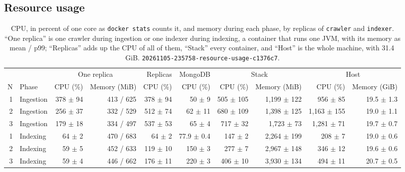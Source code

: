 \documentclass[11pt,a4paper]{article}
\newcommand{\code}[1]{\nolinkurl{#1}}
\newcommand{\run}[1]{\nolinkurl{#1}}
\begin{document}
\subsection{Resource usage}
\label{sec:resources}

\begin{table}[ht]
\centering
\scriptsize
\setlength{\tabcolsep}{3.5pt}
\caption{CPU, in percent of one core as \code{docker stats} counts it, and memory during each phase, by replicas of
\code{crawler} and \code{indexer}. ``One replica'' is one crawler during ingestion or one indexer during indexing, a
container that runs one JVM, with its memory as mean / p99; ``Replicas'' adds up the CPU of all of them, ``Stack''
every container, and ``Host'' is the whole machine, with 31.4\,GiB. \run{20261105-235758-resource-usage-c1376c7}.}
\label{tab:resources}
\begin{tabular}{@{}rlrrrrrrrr@{}}
\toprule
& & \multicolumn{2}{c}{One replica} & Replicas & MongoDB & \multicolumn{2}{c}{Stack} & \multicolumn{2}{c}{Host} \\
\cmidrule(lr){3-4}\cmidrule(lr){5-5}\cmidrule(lr){6-6}\cmidrule(lr){7-8}\cmidrule(l){9-10}
N & Phase & CPU (\%) & Memory (MiB) & CPU (\%) & CPU (\%) & CPU (\%) & Memory (MiB) & CPU (\%) & Memory (GiB) \\
\midrule
1 & Ingestion & 378 $\pm$ 94 & 413 / 625 & 378 $\pm$ 94 & 50 $\pm$ 9 & 505 $\pm$ 105 & 1{,}199 $\pm$ 122 & 956 $\pm$ 85 & 19.5 $\pm$ 1.3 \\
2 & Ingestion & 256 $\pm$ 37 & 332 / 529 & 512 $\pm$ 74 & 62 $\pm$ 11 & 680 $\pm$ 109 & 1{,}398 $\pm$ 125 & 1{,}163 $\pm$ 155 & 19.0 $\pm$ 1.1 \\
3 & Ingestion & 179 $\pm$ 18 & 334 / 497 & 537 $\pm$ 53 & 65 $\pm$ 4 & 717 $\pm$ 32 & 1{,}723 $\pm$ 73 & 1{,}281 $\pm$ 71 & 19.7 $\pm$ 0.7 \\
1 & Indexing & 64 $\pm$ 2 & 470 / 683 & 64 $\pm$ 2 & 77.9 $\pm$ 0.4 & 147 $\pm$ 2 & 2{,}264 $\pm$ 199 & 208 $\pm$ 7 & 19.0 $\pm$ 0.6 \\
2 & Indexing & 59 $\pm$ 5 & 452 / 633 & 119 $\pm$ 10 & 150 $\pm$ 3 & 277 $\pm$ 7 & 2{,}967 $\pm$ 148 & 346 $\pm$ 12 & 19.6 $\pm$ 0.6 \\
3 & Indexing & 59 $\pm$ 4 & 446 / 662 & 176 $\pm$ 11 & 220 $\pm$ 3 & 406 $\pm$ 10 & 3{,}930 $\pm$ 134 & 494 $\pm$ 11 & 20.7 $\pm$ 0.5 \\
\bottomrule
\end{tabular}
\end{table}
\end{document}
